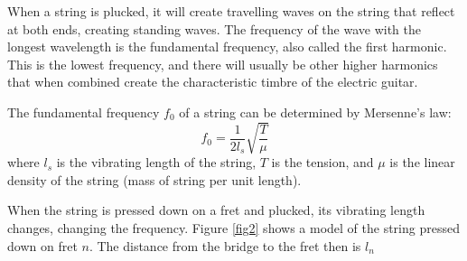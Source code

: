 When a string is plucked, it will create travelling waves on the string that reflect at both ends, creating standing waves. The frequency of the wave with the longest wavelength is the fundamental frequency, also called the first harmonic. This is the lowest frequency, and there will usually be other higher harmonics that when combined create the characteristic timbre of the electric guitar.

The fundamental frequency $f_0$ of a string can be determined by Mersenne's law:
\begin{equation}\label{eqn1}
    f_0 = \frac{1}{2l_s}\sqrt{\frac{T}{\mu}}
\end{equation}
where $l_s$ is the vibrating length of the string, $T$ is the tension, and $\mu$ is the linear density of the string (mass of string per unit length). \cite{mersenne} \par
When the string is pressed down on a fret and plucked, its vibrating length changes, changing the frequency. Figure \ref{fig2} shows a model of the string pressed down on fret $n$. The distance from the bridge to the fret then is $l_n$

